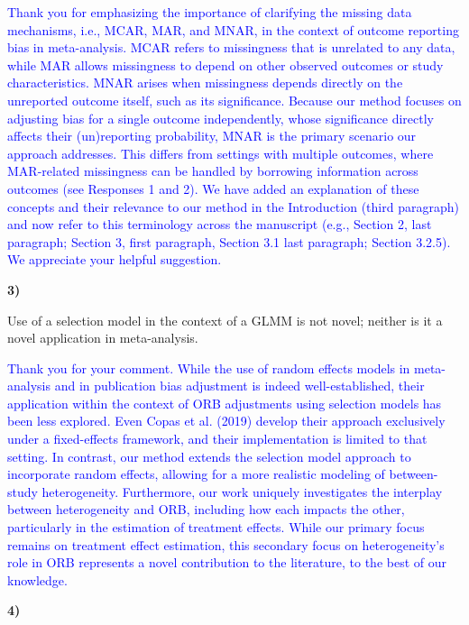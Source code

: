 \documentclass{article}
\begin{document}
\bigskip

\textcolor{blue}{Thank you for emphasizing the importance of clarifying the missing data mechanisms, i.e., MCAR, MAR, and MNAR, in the context of outcome reporting bias in meta-analysis. MCAR refers to missingness that is unrelated to any data, while MAR allows missingness to depend on other observed outcomes or study characteristics. MNAR arises when missingness depends directly on the unreported outcome itself, such as its significance. Because our method focuses on adjusting bias for a single outcome independently, whose significance directly affects their (un)reporting probability, MNAR is the primary scenario our approach addresses. This differs from settings with multiple outcomes, where MAR-related missingness can be handled by borrowing information across outcomes (see Responses 1 and 2). We have added an explanation of these concepts and their relevance to our method in the Introduction (third paragraph) and now refer to this terminology across the manuscript (e.g., Section 2, last paragraph; Section 3, first paragraph, Section 3.1 last paragraph; Section 3.2.5). We appreciate your helpful suggestion.}

\bigskip

\textbf{3)}

\bigskip

Use of a selection model in the context of a GLMM is not novel; neither is it a novel application in meta-analysis. 

\bigskip

\textcolor{blue}{Thank you for your comment. While the use of random effects models in meta-analysis and in publication bias adjustment is indeed well-established, their application within the context of ORB adjustments using selection models has been less explored. Even Copas et al. (2019) develop their approach exclusively under a fixed-effects framework, and their implementation is limited to that setting. In contrast, our method extends the selection model approach to incorporate random effects, allowing for a more realistic modeling of between-study heterogeneity. Furthermore, our work uniquely investigates the interplay between heterogeneity and ORB, including how each impacts the other, particularly in the estimation of treatment effects. While our primary focus remains on treatment effect estimation, this secondary focus on heterogeneity’s role in ORB represents a novel contribution to the literature, to the best of our knowledge.}

\textbf{4)}
\end{document}
